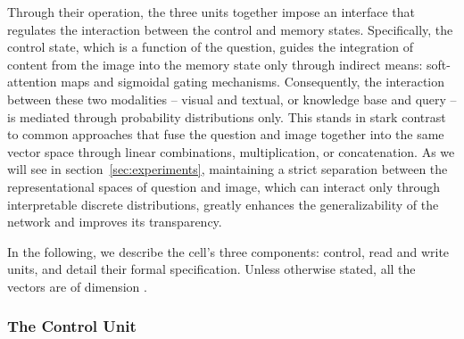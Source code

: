 \documentclass[fleqn]{article}
\newcommand{\secref}[1]{section~\ref{sec:#1}}
\begin{document}
Through their operation, the three units together impose an interface that regulates the interaction between the control and memory states. Specifically, the control state, which is a function of the question, guides the integration of content from the image into the memory state only through indirect means: soft-attention maps and sigmoidal gating mechanisms. Consequently, the interaction between these two modalities -- visual and textual, or knowledge base and query -- is mediated through probability distributions only. This stands in stark contrast to common approaches that fuse the question and image together into the same vector space through linear combinations, multiplication, or concatenation. As we will see in \secref{experiments}, maintaining a strict separation between the representational spaces of question and image, which can interact only through interpretable discrete distributions, greatly enhances the generalizability of the network and improves its transparency.


In the following, we describe the cell's three components: control, read and write units, and detail their formal specification. Unless otherwise stated, all the vectors are of dimension . 

\subsubsection{The Control Unit}
\label{sec:CU}
\end{document}
